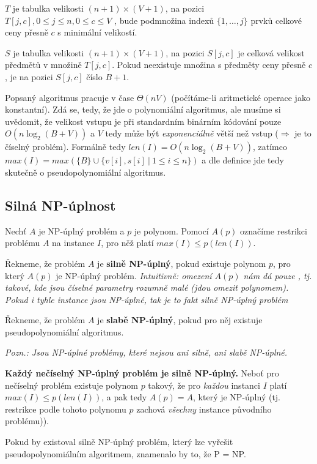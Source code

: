 \documentclass[11pt]{report} %
\numberwithin{equation}{section}
\begin{document}
$T$ je tabulka velikosti $(n + 1) \times (V + 1)$, na pozici $T[j, c], 0 \leq j \leq n, 0 \leq c \leq V$ , bude podmnožina indexů $\{1, \dots, j\}$ prvků celkové ceny přesně $c$ s minimální velikostí.

$S$ je tabulka velikosti $(n+1)\times(V+1)$, na pozici $S[j, c]$ je celková velikost předmětů
v množině $T[j, c]$. Pokud neexistuje množina s předměty ceny přesně $c$, je na pozici
$S[j, c]$ číslo $B + 1$.

Popsaný algoritmus pracuje v čase $\Theta(nV)$ (počítáme-li aritmetické operace jako konstantní). Zdá se, tedy, že jde o polynomiální algoritmus, ale musíme si uvědomit, že velikost vstupu je při standardním binárním kódování pouze $O(n \log_2(B + V ))$ a $V$ tedy může být \textit{exponenciálně} větší než vstup ($\Rightarrow$ je to číselný problém). Formálně tedy $len(I) = O(n\log_2(B+V))$, zatímco $max(I) = max(\{B\} \cup \{v[i], s[i]\ |\ 1 \leq i \leq n \})$ a dle definice jde tedy skutečně o pseudopolynomiální algoritmus.


\subsection{Silná NP-úplnost}
Nechť $A$ je NP-úplný problém a $p$ je polynom. Pomocí $A(p)$ označíme restrikci problému $A$ na instance $I$, pro něž
platí $max(I) \leq p(len(I))$.

Řekneme, že problém $A$ je \textbf{silně NP-úplný}, pokud existuje polynom $p$, pro který $A(p)$ je NP-úplný problém.
\textit{Intuitivně: omezení $A(p)$ nám dá pouze , tj. takové, kde jsou číselné parametry rozumně malé (jdou omezit polynomem). Pokud i tyhle  instance jsou NP-úplné, tak je to fakt silně NP-úplný problém}

Řekneme, že problém $A$ je \textbf{slabě NP-úplný}, pokud pro něj existuje pseudopolynomiální algoritmus.

\textit{Pozn.: Jsou NP-úplné problémy, které nejsou ani silně, ani slabě NP-úplné.}

\textbf{Každý nečíselný NP-úplný problém je silně NP-úplný.} Neboť pro nečíselný problém existuje polynom $p$ takový, že pro \textit{každou} instanci $I$ platí $max(I) \leq p(len(I))$, a pak tedy $A(p) = A$, který je NP-úplný (tj. restrikce podle tohoto polynomu $p$ zachová \textit{všechny} instance původního problému)).

Pokud by existoval silně NP-úplný problém, který lze vyřešit pseudopolynomiálním algoritmem, znamenalo by
to, že P = NP.
\end{document}
